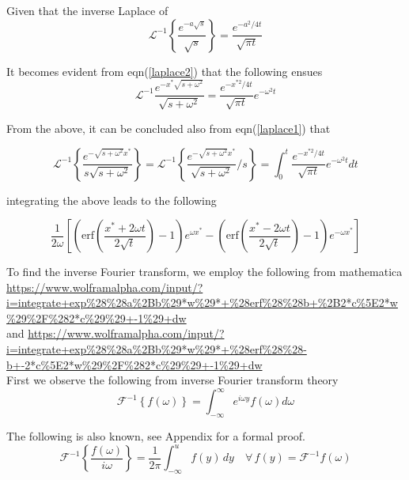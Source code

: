 \documentclass[10pt,a4,fleqn]{article}
\begin{document}
Given that the inverse Laplace of
\[\mathscr{L}^{-1} \left\{\frac{e^{-a\sqrt{s}}}{\sqrt{s}}\right \} = \frac{e^{-a^2/4t}}{\sqrt{\pi t}}\]

It becomes evident from eqn(\ref{laplace2}) that the following ensues
\begin{equation}
  \mathscr{L}^{-1} \frac{e^{-x^*\sqrt{s+\omega^2}}}{\sqrt{s + \omega^2}} = \frac{e^{-{x^{*2}/4t}}}{\sqrt{\pi t}} e^{-\omega^2t} 
\end{equation}

From the above, it can be concluded also from eqn(\ref{laplace1}) that

\begin{equation}
    \mathscr{L}^{-1}  \left\{ \frac{e^{-\sqrt{s +\omega^2}x^*}}{s\sqrt{s +\omega^2}} \right\}
     = \mathscr{L}^{-1}\left\{ \frac{e^{-\sqrt{s +\omega^2}x^*}}{\sqrt{s +\omega^2}}/{s} \right\}= \int_0^t \frac{e^{-{x^{*2}/4t}}}{\sqrt{\pi t}} e^{-\omega^2t} dt
\end{equation}

integrating the above leads to the following

\begin{equation}\label{13}
    \frac{1}{2\omega}\left[\left(\mathrm{erf}\left(\frac{x^* + 2\omega t}{2\sqrt{t}}\right) - 1\right ) e^{\omega x^*} - \left(\mathrm{erf}\left(\frac{x^* - 2\omega t}{2\sqrt{t}}\right) - 1\right ) e^{-\omega x^*}\right]
\end{equation}

To find the inverse Fourier transform, we employ the following from mathematica\\

\url{https://www.wolframalpha.com/input/?i=integrate+exp%28%28a%2Bb%29*w%29*+%28erf%28%28b+%2B2*c%5E2*w%29%2F%282*c%29%29+-1%29+dw}\\

and \url{https://www.wolframalpha.com/input/?i=integrate+exp%28%28a%2Bb%29*w%29*+%28erf%28%28-b+-2*c%5E2*w%29%2F%282*c%29%29+-1%29+dw}\\

First we observe the following from inverse Fourier transform theory
\begin{equation}
    \mathcal{F}^{-1} \left\{f(\omega)\right\} = \int_{-\infty}^{\infty} e^{i\omega y} f(\omega)d\omega
\end{equation}

The following is also known, see Appendix for a formal proof.
\[\mathcal{F}^{-1} \left\{\frac{f(\omega)}{i\omega}\right\} = \frac{1}{2\pi}\int_{-\infty}^u f(y)\,dy \quad \forall \, f(y) = \mathcal{F}^{-1}f(\omega)\]
\end{document}
